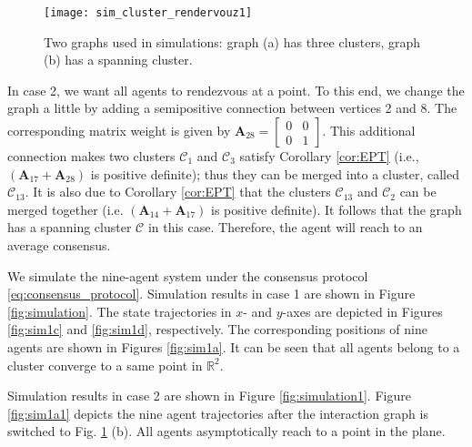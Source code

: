 \documentclass[draftclsnofoot,11pt,onecolumn]{IEEEtran}
\newcommand{\m}[1]{\mathbf{#1}}
\newcommand{\mc}[1]{\mathcal{#1}}
\newcommand{\mb}[1]{\mathbb{#1}}
\begin{document}
\begin{figure}[t!]
\begin{center}
\texttt{[image: sim\_cluster\_rendervouz1]}
\caption{Two graphs used in simulations: graph (a) has three clusters, graph (b) has a spanning cluster.}
\label{fig:cluster}
\end{center}
\end{figure}

In case 2, we want all agents to rendezvous at a point. To this end, we change the graph a little by adding a semipositive connection between vertices 2 and 8. The corresponding matrix weight is given by  $\m{A}_{28} = \begin{bmatrix} 0&0\\0&1\end{bmatrix}$. This additional connection makes two clusters $\mc{C}_1$ and $\mc{C}_3$ satisfy Corollary \ref{cor:EPT} (i.e., $(\m{A}_{17} + \m{A}_{28})$ is positive definite); thus they can be merged into a cluster, called $\mc{C}_{13}$. It is also due to Corollary \ref{cor:EPT} that the clusters $\mc{C}_{13}$ and $\mc{C}_{2}$ can be merged together (i.e. $(\m{A}_{14} + \m{A}_{17})$ is positive definite). It follows that the graph has a spanning cluster $\mc{C}$ in this case. Therefore, the agent will reach to an average consensus.

We simulate the nine-agent system under the consensus protocol \eqref{eq:consensus_protocol}. Simulation results in case 1 are shown in Figure \ref{fig:simulation}. The state trajectories in $x$- and $y$-axes are depicted in Figures \ref{fig:sim1c} and \ref{fig:sim1d}, respectively. The corresponding positions of nine agents are shown in Figures \ref{fig:sim1a}. It can be seen that all agents belong to a cluster converge to a same point in $\mb{R}^2$.

Simulation results in case 2 are shown in Figure \ref{fig:simulation1}. Figure \ref{fig:sim1a1} depicts the nine agent trajectories after the interaction graph is switched to Fig. \ref{fig:cluster} (b). All agents asymptotically reach to a point in the plane.
\end{document}
